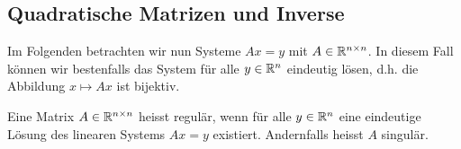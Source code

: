 \subsection{Quadratische Matrizen und Inverse}
\label{\detokenize{vektorraeume/LGS:quadratische-matrizen-und-inverse}}
Im Folgenden betrachten wir nun Systeme \(Ax = y\) mit \(A \in \mathbb{R}^{n \times n}\). In diesem Fall können wir bestenfalls das System für alle \(y \in \mathbb{R}^n\) eindeutig lösen, d.h. die Abbildung \(x \mapsto Ax\) ist bijektiv.
\label{vektorraeume/LGS:definition-8}
\begin{definition}{}{}



Eine Matrix \(A \in \mathbb{R}^{n \times n}\) heisst regulär, wenn für alle \(y \in \mathbb{R}^n\) eine eindeutige Lösung des linearen Systems \(Ax=y\) existiert. Andernfalls heisst \(A\) singulär.
\end{definition}

